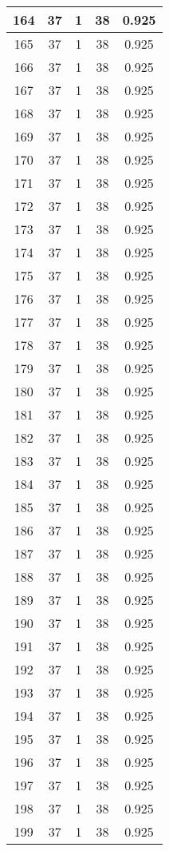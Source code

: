 \documentclass[letterpaper, 12pt]{article}
\begin{document}
\begin{longtable}{|c|c|c|c|c|}
\hline
164 & 37 & 1 & 38 & 0.925 \\
\hline
165 & 37 & 1 & 38 & 0.925 \\
\hline
166 & 37 & 1 & 38 & 0.925 \\
\hline
167 & 37 & 1 & 38 & 0.925 \\
\hline
168 & 37 & 1 & 38 & 0.925 \\
\hline
169 & 37 & 1 & 38 & 0.925 \\
\hline
170 & 37 & 1 & 38 & 0.925 \\
\hline
171 & 37 & 1 & 38 & 0.925 \\
\hline
172 & 37 & 1 & 38 & 0.925 \\
\hline
173 & 37 & 1 & 38 & 0.925 \\
\hline
174 & 37 & 1 & 38 & 0.925 \\
\hline
175 & 37 & 1 & 38 & 0.925 \\
\hline
176 & 37 & 1 & 38 & 0.925 \\
\hline
177 & 37 & 1 & 38 & 0.925 \\
\hline
178 & 37 & 1 & 38 & 0.925 \\
\hline
179 & 37 & 1 & 38 & 0.925 \\
\hline
180 & 37 & 1 & 38 & 0.925 \\
\hline
181 & 37 & 1 & 38 & 0.925 \\
\hline
182 & 37 & 1 & 38 & 0.925 \\
\hline
183 & 37 & 1 & 38 & 0.925 \\
\hline
184 & 37 & 1 & 38 & 0.925 \\
\hline
185 & 37 & 1 & 38 & 0.925 \\
\hline
186 & 37 & 1 & 38 & 0.925 \\
\hline
187 & 37 & 1 & 38 & 0.925 \\
\hline
188 & 37 & 1 & 38 & 0.925 \\
\hline
189 & 37 & 1 & 38 & 0.925 \\
\hline
190 & 37 & 1 & 38 & 0.925 \\
\hline
191 & 37 & 1 & 38 & 0.925 \\
\hline
192 & 37 & 1 & 38 & 0.925 \\
\hline
193 & 37 & 1 & 38 & 0.925 \\
\hline
194 & 37 & 1 & 38 & 0.925 \\
\hline
195 & 37 & 1 & 38 & 0.925 \\
\hline
196 & 37 & 1 & 38 & 0.925 \\
\hline
197 & 37 & 1 & 38 & 0.925 \\
\hline
198 & 37 & 1 & 38 & 0.925 \\
\hline
199 & 37 & 1 & 38 & 0.925 \\
\hline
\end{longtable}
\end{document}
